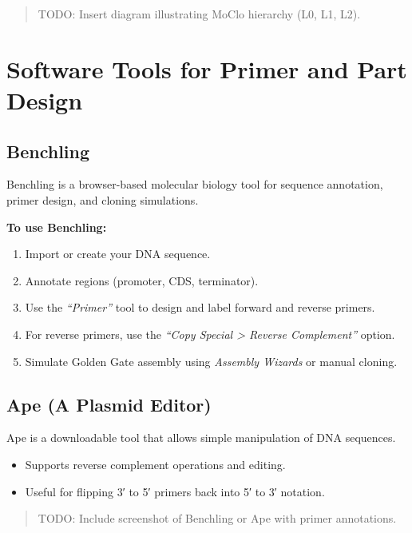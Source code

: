 \documentclass[
  letterpaper,
  DIV=11,
  numbers=noendperiod]{scrreprt}
\providecommand{\tightlist}{%
  \setlength{\itemsep}{0pt}\setlength{\parskip}{0pt}}\usepackage{longtable,booktabs,array}
\begin{document}
\begin{quote}
TODO: Insert diagram illustrating MoClo hierarchy (L0, L1, L2).
\end{quote}

\section{Software Tools for Primer and Part
Design}\label{software-tools-for-primer-and-part-design}

\subsection{Benchling}\label{benchling}

Benchling is a browser-based molecular biology tool for sequence
annotation, primer design, and cloning simulations.

\textbf{To use Benchling:}

\begin{enumerate}
\def\labelenumi{\arabic{enumi}.}
\tightlist
\item
  Import or create your DNA sequence.
\item
  Annotate regions (promoter, CDS, terminator).
\item
  Use the \emph{``Primer''} tool to design and label forward and reverse
  primers.
\item
  For reverse primers, use the \emph{``Copy Special \textgreater{}
  Reverse Complement''} option.
\item
  Simulate Golden Gate assembly using \emph{Assembly Wizards} or manual
  cloning.
\end{enumerate}

\subsection{Ape (A Plasmid Editor)}\label{ape-a-plasmid-editor}

Ape is a downloadable tool that allows simple manipulation of DNA
sequences.

\begin{itemize}
\tightlist
\item
  Supports reverse complement operations and editing.
\item
  Useful for flipping 3′ to 5′ primers back into 5′ to 3′ notation.
\end{itemize}

\begin{quote}
TODO: Include screenshot of Benchling or Ape with primer annotations.
\end{quote}
\end{document}
